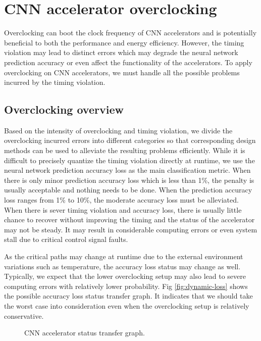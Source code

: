 \section{CNN accelerator overclocking} \label{sec:framework}
Overclocking can boot the clock frequency of CNN accelerators and is potentially beneficial to both 
the performance and energy efficiency. However, the timing violation may lead to distinct errors which 
may degrade the neural network prediction accuracy or even affect the functionality of the accelerators. 
To apply overclocking on CNN accelerators, we must handle all the possible 
problems incurred by the timing violation. 

\subsection{Overclocking overview}
Based on the intensity of overclocking and timing 
violation, we divide the overclocking incurred errors into different 
categories so that corresponding design methods can be used to 
alleviate the resulting problems efficiently. While it is difficult 
to precisely quantize the timing violation directly at runtime, we use 
the neural network prediction accuracy loss as the main 
classification metric. When there is only minor prediction accuracy 
loss which is less than 1\%, the penalty is usually acceptable 
and nothing needs to be done. When the prediction accuracy loss 
ranges from 1\% to 10\%, the moderate accuracy loss must be 
alleviated. When there is sever timing violation and 
accuracy loss, there is usually little chance to recover 
without improving the timing and the status of the accelerator 
may not be steady. It may result in considerable computing errors 
or even system stall due to critical control signal faults.  

As the critical paths may change at runtime due to the external 
environment variations such as temperature, the accuracy loss status may 
change as well. Typically, we expect that the lower overclocking setup 
may also lead to severe computing errors with relatively lower probability.
Fig \ref{fig:dynamic-loss} shows the possible accuracy loss status 
transfer graph. It indicates that we should take the worst case 
into consideration even when the overclocking setup is relatively conservative.
\begin{figure}
    \caption{CNN accelerator status transfer graph.}
\label{fig:loss-estimation}
\vspace{-1em}
\end{figure}

